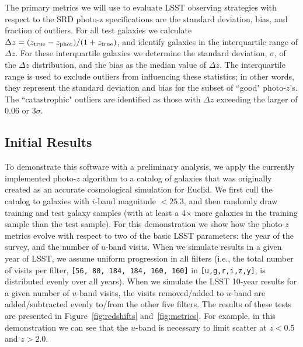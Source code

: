 The primary metrics we will use to evaluate LSST
observing strategies with respect to the SRD photo-z specifications are the
standard deviation, bias, and fraction of outliers. For all test
galaxies we calculate $\Delta z = (z_{\rm true} - z_{\rm phot}) /
(1+z_{\rm true})$, and identify galaxies in the interquartile range of
$\Delta z$. For these interquartile galaxies we determine the standard
deviation, $\sigma$, of the $\Delta z$ distribution, and the bias as the
median value of $\Delta z$. The interquartile range is used to exclude
outliers from influencing these statistics; in other words, they
represent the standard deviation and bias for the subset of ``good"
photo-$z$'s. The ``catastrophic" outliers are identified as those with
$\Delta z$ exceeding the larger of 0.06 or 3$\sigma$.


\subsection{Initial Results}

To demonstrate this software with a
preliminary analysis, we apply the currently implemented photo-$z$
algorithm to a catalog of galaxies that was originally created as an
accurate cosmological simulation for Euclid. We first cull the catalog
to galaxies with $i$-band magnitude $<25.3$, and then randomly draw
training and test galaxy samples (with at least a 4$\times$ more
galaxies in the training sample than the test sample). For this
demonstration we show how the photo-$z$ metrics evolve with respect to
two of the basic LSST parameters: the year of the survey, and the number
of $u$-band visits. When we simulate results in a given year of LSST, we
assume uniform progression in all filters (i.e., the total number of
visits per filter, \texttt{[56, 80, 184, 184, 160, 160]} in
\texttt{[u,g,r,i,z,y]}, is distributed evenly over all years). When we
simulate the LSST 10-year results for a given number of $u$-band visits,
the visits removed/added to $u$-band are added/subtracted evenly to/from
the other five filters. The results of these tests are presented in
Figure~\ref{fig:redshifts} and~\ref{fig:metrics}. For example, in this
demonstration we can see that the $u$-band is necessary to limit scatter
at $z<0.5$ and $z>2.0$.

